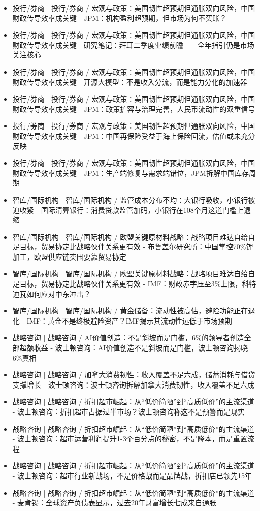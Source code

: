 \documentclass[11pt]{ctexart}
\begin{document}
\begin{itemize}
  \item [R081] 投行/券商 | 投行/券商 / 宏观与政策：美国韧性超预期但通胀双向风险，中国财政传导效率成关键 - JPM：机构盈利超预期，但市场为何不买账？
  \item [R082] 投行/券商 | 投行/券商 / 宏观与政策：美国韧性超预期但通胀双向风险，中国财政传导效率成关键 - 研究笔记：拜耳二季度业绩前瞻——全年指引仍是市场关注核心
  \item [R083] 投行/券商 | 投行/券商 / 宏观与政策：美国韧性超预期但通胀双向风险，中国财政传导效率成关键 - 开源大模型：不是收入分流，而是能力分化的加速器
  \item [R084] 投行/券商 | 投行/券商 / 宏观与政策：美国韧性超预期但通胀双向风险，中国财政传导效率成关键 - JPM：政策扩容与治理完善，人民币流动性的双重信号
  \item [R085] 投行/券商 | 投行/券商 / 宏观与政策：美国韧性超预期但通胀双向风险，中国财政传导效率成关键 - JPM：中国再保险受益于海上保险回流，估值或未充分反映
  \item [R086] 投行/券商 | 投行/券商 / 宏观与政策：美国韧性超预期但通胀双向风险，中国财政传导效率成关键 - JPM：生产端修复与需求端错位，JPM拆解中国库存周期
  \item [R087] 智库/国际机构 | 智库/国际机构 / 监管成本分布不均：大银行吸收，小银行被迫收紧 - 国际清算银行：消费贷款监管加码，小银行在108个月这道门槛上退缩
  \item [R088] 智库/国际机构 | 智库/国际机构 / 欧盟关键原材料战略：战略项目难达自给自足目标，贸易协定比战略伙伴关系更有效 - 布鲁盖尔研究所：中国掌控70\%锂加工，欧盟供应链突围要靠贸易协定
  \item [R089] 智库/国际机构 | 智库/国际机构 / 欧盟关键原材料战略：战略项目难达自给自足目标，贸易协定比战略伙伴关系更有效 - IMF：财政赤字压至3\%上限，科特迪瓦如何应对中东冲击？
  \item [R090] 智库/国际机构 | 智库/国际机构 / 黄金储备：流动性被高估，避险功能正在退化 - IMF：黄金不是终极避险资产？IMF揭示其流动性远低于市场预期
  \item [R091] 战略咨询 | 战略咨询 / AI价值创造：不是斜坡而是门槛，6\%的领导者创造全部超额收益 - 波士顿咨询：AI价值创造不是斜坡而是门槛，波士顿咨询揭晓6\%真相
  \item [R092] 战略咨询 | 战略咨询 / 加拿大消费韧性：收入覆盖不足六成，储蓄消耗与借贷支撑增长 - 波士顿咨询：波士顿咨询拆解加拿大消费韧性，收入覆盖不足六成
  \item [R093] 战略咨询 | 战略咨询 / 折扣超市崛起：从“低价简陋”到“高质低价”的主流渠道 - 波士顿咨询：折扣超市占据过半市场？波士顿咨询称这不是预警而是现实
  \item [R094] 战略咨询 | 战略咨询 / 折扣超市崛起：从“低价简陋”到“高质低价”的主流渠道 - 波士顿咨询：超市运营利润提升1-3个百分点的秘密，不是降本，而是重置流程
  \item [R095] 战略咨询 | 战略咨询 / 折扣超市崛起：从“低价简陋”到“高质低价”的主流渠道 - 波士顿咨询：超市行业新战场，不是价格战而是品牌战，折扣店已领先15年
  \item [R096] 战略咨询 | 战略咨询 / 折扣超市崛起：从“低价简陋”到“高质低价”的主流渠道 - 麦肯锡：全球资产负债表显示，过去20年财富增长七成来自通胀
\end{itemize}
\end{document}
